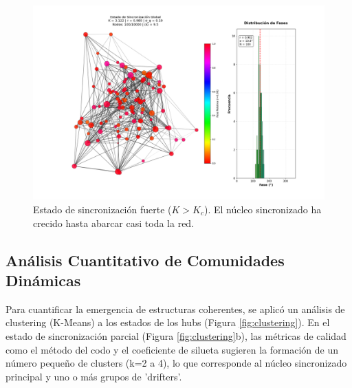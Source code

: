 \documentclass[12pt, a4paper]{article}
\begin{document}
\begin{figure}[p]
    \centering
    \includegraphics[width=\textwidth]{img/2_6.png}
    \caption{Estado de sincronización fuerte ($K > K_c$). El núcleo sincronizado ha crecido hasta abarcar casi toda la red.}
    \label{fig:mecanismo_c}
\end{figure}


\subsection{Análisis Cuantitativo de Comunidades Dinámicas}
Para cuantificar la emergencia de estructuras coherentes, se aplicó un análisis de clustering (K-Means) a los estados de los hubs (Figura \ref{fig:clustering}). En el estado de sincronización parcial (Figura \ref{fig:clustering}b), las métricas de calidad como el método del codo y el coeficiente de silueta sugieren la formación de un número pequeño de clusters (k=2 a 4), lo que corresponde al núcleo sincronizado principal y uno o más grupos de 'drifters'.
\end{document}

